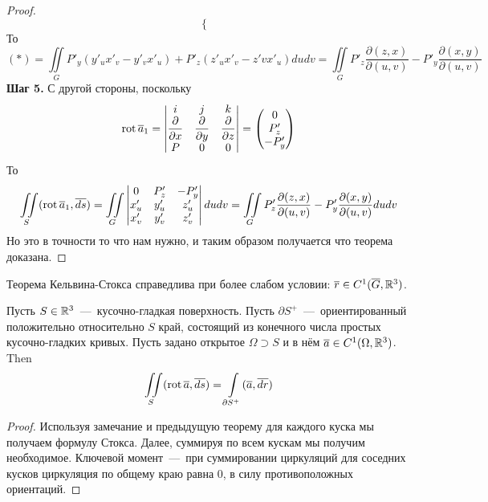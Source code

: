 \begin{proof}
\begin{equation*}
\begin{cases}
        \end{cases}
    \end{equation*}
    То \[(*) = \iint\limits_G P'_y(y'_ux'_v - y'_vx'_u) + P'_z(z'_ux'_v - z'vx'_u)dudv = \iint\limits_G P'_z\dfrac{\partial(z, x)}{\partial(u, v)} - P'_y \dfrac{\partial(x, y)}{\partial(u, v)}\]
    \textbf{Шаг 5.} С другой стороны, поскольку \[\operatorname{rot} \overline{a}_1 = \begin{vmatrix}
        i & j & k \\ \dfrac{\partial}{\partial x} & \dfrac{\partial}{\partial y} & \dfrac{\partial}{\partial z} \\ P & 0 & 0
    \end{vmatrix} = \begin{pmatrix}
        0 \\ P'_z \\ -P'_y
    \end{pmatrix}\]
    То \[\iint\limits_S (\operatorname{rot} \overline{a}_1, \overline{ds}) = \iint\limits_G \begin{vmatrix}
        0 & P'_z & -P'_y \\ x'_u & y'_u & z'_u \\ x'_v & y'_v & z'_v
    \end{vmatrix} dudv = \iint\limits_G P'_z \dfrac{\partial(z, x)}{\partial(u, v)} - P'_y \dfrac{\partial(x, y)}{\partial(u, v)}dudv\]
    Но это в точности то что нам нужно, и таким образом получается что теорема доказана.
\end{proof}
\begin{note}
    Теорема Кельвина-Стокса справедлива при более слабом условии: $\overline{r} \in C^1(\overline{G}, \mathbb{R}^3)$.
\end{note}
\begin{theorem}
    Пусть $S \in \mathbb{R}^3$~---~кусочно-гладкая поверхность. Пусть $\partial S^+$~---~ориентированный положительно относительно $S$ край, состоящий из конечного числа простых кусочно-гладких кривых. Пусть задано открытое $\Omega \supset S$ и в нём $\overline{a} \in C^1(\Omega, \mathbb{R}^3)$. Then \[\iint\limits_S (\operatorname{rot} \overline{a}, \overline{ds}) = \int\limits_{\partial S^+} (\overline{a}, \overline{dr})\]
\end{theorem}
\begin{proof}
    Используя замечание и предыдущую теорему для каждого куска мы получаем формулу Стокса. Далее, суммируя по всем кускам мы получим необходимое. Ключевой момент~---~при суммировании циркуляций для соседних кусков циркуляция по общему краю равна 0, в силу противоположных ориентаций.
\end{proof}

